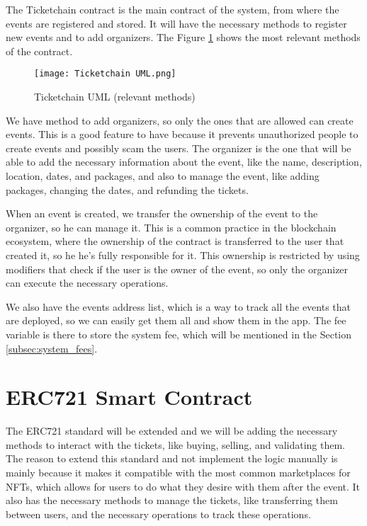 The Ticketchain contract is the main contract of the system, from where the
events are registered and stored. It will have the necessary methods to
register new events and to add organizers. The Figure \ref{fig:ticketchain_uml}
shows the most relevant methods of the contract.

\begin{figure}[H]
	\texttt{[image: Ticketchain UML.png]}
	\centering
	\caption{Ticketchain UML (relevant methods)}
	\label{fig:ticketchain_uml}
\end{figure}

We have method to add organizers, so only the ones that are allowed can create
events. This is a good feature to have because it prevents unauthorized people
to create events and possibly scam the users. The organizer is the one that
will be able to add the necessary information about the event, like the name,
description, location, dates, and packages, and also to manage the event, like
adding packages, changing the dates, and refunding the tickets.

When an event is created, we transfer the ownership of the event to the
organizer, so he can manage it. This is a common practice in the blockchain
ecosystem, where the ownership of the contract is transferred to the user that
created it, so he he's fully responsible for it. This ownership is restricted
by using modifiers that check if the user is the owner of the event, so only
the organizer can execute the necessary operations.

We also have the events address list, which is a way to track all the events
that are deployed, so we can easily get them all and show them in the app. The
fee variable is there to store the system fee, which will be mentioned in the
Section \ref{subsec:system_fees}.

\section{ERC721 Smart Contract}
\label{subsec:erc721_smart_contract}

The ERC721 standard will be extended and we will be adding the necessary
methods to interact with the tickets, like buying, selling, and validating
them. The reason to extend this standard and not implement the logic manually
is mainly because it makes it compatible with the most common marketplaces for
NFTs, which allows for users to do what they desire with them after the event.
It also has the necessary methods to manage the tickets, like transferring them
between users, and the necessary operations to track these operations.

